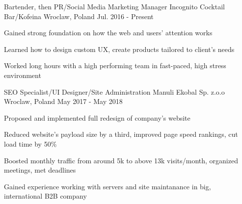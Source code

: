 
\begin{cventries}

  \cventry
    {Bartender, then PR/Social Media Marketing Manager} %
    {Incognito Cocktail Bar/Kofeina} %
    {Wroclaw, Poland} %
    {Jul. 2016 - Present} %
    {
      \begin{cvitems} %
        \item Gained strong foundation on how the web and users' attention works
        \item Learned how to design custom UX, create products tailored to client's needs
        \item Worked long hours with a high performing team in fast-paced, high stress environment
      \end{cvitems}
    }

  \cventry
    {SEO Specialist/UI Designer/Site Administration} %
    {Manuli Ekobal Sp. z.o.o} %
    {Wroclaw, Poland} %
    {May 2017 - May 2018} %
    {
      \begin{cvitems} %
      \item Proposed and implemented full redesign of company's website
        \item Reduced website's payload size by a third, improved page speed rankings, cut load time by 50\%
        \item Boosted monthly traffic from around 5k to above 13k visits/month, organized meetings, met deadlines
        \item Gained experience working with servers and site maintanance in big, international B2B company
      \end{cvitems}
    }

\end{cventries}
